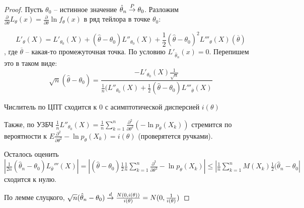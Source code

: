 \documentclass[document.tex]{subfiles}
\begin{document}
\begin{proof}
    Пусть $\theta_0$ -- истинное значение $\hat \theta_n \stackrel{P}{\rightarrow} \theta_0$. Разложим $\frac{\partial}{\partial \theta}L_{\theta}(x)
    = \frac{\partial}{\partial \theta}\ln f_{\theta}(x)$ в ряд тейлора в точке $\theta_0$:

    \[
        L'_{\theta}(X) = L'_{\theta_0}(X) + (\hat \theta - \theta_0) L''_{\theta_0}(X) + \frac{1}{2}(\hat \theta -
        \theta_0)^2 L'''_{\theta}(X) (\overline \theta)
    \], где $\overline \theta$ -- какая-то промежуточная точка. По условию $L'_{\hat \theta_n}(x) = 0$. Перепишем это в
    таком виде:
    \[
        \sqrt{n}(\hat \theta - \theta_0) = \frac{-L'_{\theta_0}(X) \frac{1}{\sqrt{n}}}{\frac{1}{n}(L''_{\theta_0}(X) +
        \frac{1}{2}(\hat \theta - \theta_0)L'''_{\overline \theta}(X)}
    \]

    Числитель по ЦПТ сходится к 0 с асимптотической дисперсией $i(\theta)$

    Также, по УЗБЧ $\frac{1}{n}L''_{\theta_0}(X) = \frac{1}{n}\sum_{k = 1}^n\frac{\partial^2}{\partial \theta^2}(-\ln
    p_{\theta}(X_k))$ стремится по вероятности к $E\frac{\partial^2}{\partial \theta^2}-\ln p_{\theta}(X_k) = i(\theta)$ (проверятется
    ручками).

    Осталось оценить $|\frac{1}{2n}(\hat \theta_n - \theta_0) L_{\overline \theta}'''(X)| = |(\hat \theta - \theta_0)
    \frac{1}{2}\frac{1}{n}\sum_{k = 1}^n
    \frac{\partial^3}{\partial \theta^3}-\ln p_{\theta}(X_k)| \leq |\frac{1}{n}\sum_{k = 1}^n M(X_k)
    \frac{1}{2}(\hat \theta_n - \theta_0|$ сходится к нулю.

    По лемме слуцкого, $\sqrt{n}(\hat \theta_n - \theta_0) \stackrel{d}{\rightarrow} \frac{N(0, i(\theta))}{i(\theta)} = N(0,
        \frac{1}{i(\theta)})$
\end{proof}
\end{document}
